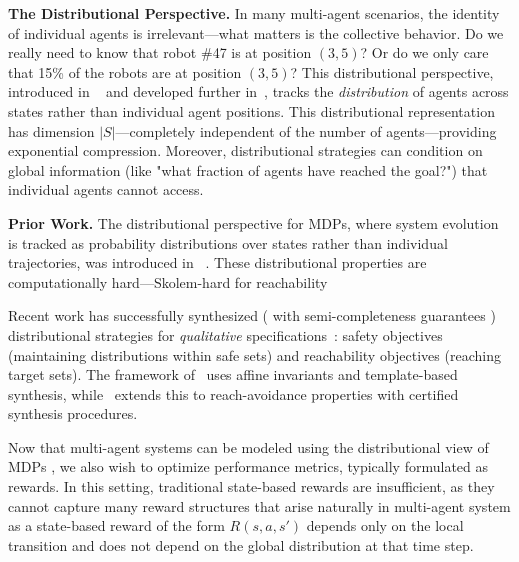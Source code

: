 \documentclass{article}
\newcommand{\ak}[1]{\textcolor{red}{ak: #1}}
\begin{document}
\textbf{The Distributional Perspective.} In many multi-agent scenarios, the identity of individual agents is irrelevant—what matters is the collective behavior. Do we really need to know that robot \#47 is at position $(3,5)$? Or do we only care that 15\% of the robots are at position $(3,5)$? This distributional perspective, introduced in ~\citep{akshay2018distributionbased} and developed further in~\citep{akshay2023mdpsdistributiontransformersaffine, akshay2024certifiedpolicyverificationsynthesis}, tracks the \emph{distribution} of agents across states rather than individual agent positions. This distributional representation has dimension $|S|$—completely independent of the number of agents—providing exponential compression. Moreover, distributional strategies can condition on global information (like "what fraction of agents have reached the goal?") that individual agents cannot access.



\textbf{Prior Work.} The distributional perspective for MDPs, where system evolution is tracked as probability distributions over states rather than individual trajectories, was introduced in ~\citep{akshay2018distributionbased}. These distributional properties are computationally hard—Skolem-hard for reachability~\citep{akshay2015reachability}


Recent work has successfully synthesized ( with semi-completeness guarantees )  distributional strategies for \emph{qualitative} specifications~\citep{akshay2023mdpsdistributiontransformersaffine, akshay2024certifiedpolicyverificationsynthesis}: safety objectives (maintaining distributions within safe sets) and reachability objectives (reaching target sets). The framework of~\citep{akshay2023mdpsdistributiontransformersaffine} uses affine invariants and template-based synthesis, while~\citep{akshay2024certifiedpolicyverificationsynthesis} extends this to reach-avoidance properties with certified synthesis procedures.



Now that multi-agent systems can be modeled using the distributional view of MDPs ,
we also wish to optimize performance metrics, typically formulated as rewards. In this setting, traditional state-based rewards are insufficient, as they cannot capture many reward structures that arise naturally in multi-agent system as a state-based reward of the form $R(s,a,s')$ depends only on the local transition and does not depend on the global distribution at that time step.
\end{document}
